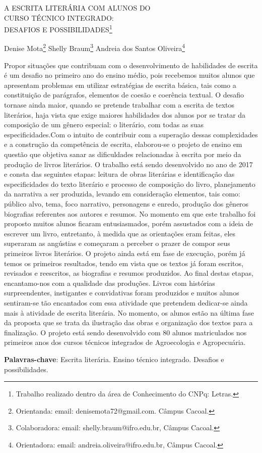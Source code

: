 \documentclass[article,12pt,onesidea,4paper,english,brazil]{abntex2}
\begin{document}
	
	
	\frenchspacing 
	
	\begin{center}
		\LARGE A ESCRITA LITERÁRIA COM ALUNOS DO \\CURSO TÉCNICO INTEGRADO:\\
		DESAFIOS E POSSIBILIDADES\footnote{Trabalho realizado dentro da área de Conhecimento do CNPq: Letras.}
		
		\normalsize
		Denise Mota\footnote{Orientanda: email: denisemota72@gmail.com. Câmpus Cacoal.} 
	Shelly Braum\footnote{Colaboradora: email: shelly.braum@ifro.edu.br, Câmpus Cacoal.} 
	Andreia dos Santos Oliveira\footnote{Orientadora: email: andreia.oliveira@ifro.edu.br, Câmpus Cacoal.} 
		\end{center}
	
	\noindent Propor situações que contribuam com o desenvolvimento de habilidades de escrita é
	um desafio no primeiro ano do ensino médio, pois recebemos muitos alunos que
	apresentam problemas em utilizar estratégias de escrita básica, tais como a
	constituição de parágrafos, elementos de coesão e coerência textual. O desafio tornase
	ainda maior, quando se pretende trabalhar com a escrita de textos literários, haja
	vista que exige maiores habilidades dos alunos por se tratar da composição de um
	gênero especial: o literário, com todas as suas especificidades.Com o intuito de
	contribuir com a superação dessas complexidades e a construção da competência
	de escrita, elaborou-se o projeto de ensino em questão que objetiva sanar as
	dificuldades relacionadas à escrita por meio da produção de livros literários. O
	trabalho está sendo desenvolvido no ano de 2017 e consta das seguintes etapas:
	leitura de obras literárias e identificação das especificidades do texto literário e
	processo de composição do livro, planejamento da narrativa a ser produzida,
	levando em consideração elementos, tais como: público alvo, tema, foco narrativo,
	personagens e enredo, produção dos gêneros biografias referentes aos autores e
	resumos. No momento em que este trabalho foi proposto muitos alunos ficaram
	entusiasmados, porém assustados com a ideia de escrever um livro, entretanto, à
	medida que as orientações eram feitas, eles superaram as angústias e começaram a
	perceber o prazer de compor seus primeiros livros literários. O projeto ainda está em
	fase de execução, porém já temos os primeiros resultados, tendo em vista que os
	textos já foram escritos, revisados e reescritos, as biografias e resumos produzidos.
	Ao final destas etapas, encantamo-nos com a qualidade das produções. Livros com
	histórias surpreendentes, instigantes e convidativas foram produzidos e muitos
	alunos sentiram-se tão encantados com essa atividade que pretendem dedicar-se
	ainda mais à atividade de escrita literária. No momento, os alunos estão na última
	fase da proposta que se trata da ilustração das obras e organização dos textos para
	a finalização. O projeto está sendo desenvolvido com 80 alunos matriculados nos
	primeiros anos dos cursos técnicos integrados de Agroecologia e Agropecuária.
	
	\vspace{\onelineskip}
	
	\noindent
	\textbf{Palavras-chave}: Escrita literária. Ensino técnico integrado. Desafios e possibilidades.
	
\end{document}

